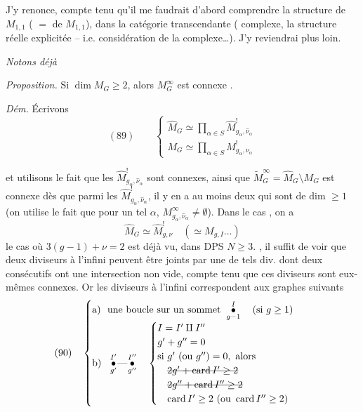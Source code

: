 \documentclass[11pt,a4paper]{article}
\begin{document}
J'y renonce, compte tenu qu'il me faudrait d'abord comprendre la structure de $M_{1,1}$ ( $=$ de $M_{1,1}$),  dans la catégorie transcendante ( complexe,   la structure réelle explicitée -- i.e. considération de la  complexe…). J'y reviendrai plus loin.

\emph{Notons déjà}

\emph{Proposition.} Si $\dim M_G \geq 2$, alors $M^{\infty}_{G}$ est connexe  .

\emph{Dém.} Écrivons
\[
(89)\qquad
\begin{cases}
\widehat{M}_G \simeq \prod\limits_{\alpha \in S} \widehat{M}^{!}_{g_\alpha, \hat{\nu}_\alpha} \\
M_G \simeq \prod\limits_{\alpha \in S} M^{!}_{g_\alpha, \nu_\alpha}
\end{cases}
\]

et utilisons le fait que les $\widehat{M}^{!}_{g_\alpha, \hat{\nu}_\alpha}$ sont connexes, ainsi que $\widetilde{M}^{\infty}_{G} = \widehat{M}_G \setminus M_G$ est connexe dès que  parmi les $\widehat{M}^{!}_{g_\alpha, \hat{\nu}_\alpha}$, il y en a au moins deux qui sont de dim $\geq 1$ (on utilise le fait que pour un tel $\alpha$, \ill{}
$M^{\infty}_{g_\alpha, \hat{\nu}_\alpha} \neq \emptyset$). Dans le cas , on a
\[
\widehat{M}_G \simeq \widehat{M}^{!}_{g,\nu} \quad (\simeq M_{g,I} \ldots)
\]
le cas où $3(g-1) + \nu = 2$ est déjà vu, \struck{\ill{}} dans DPS $N \geq 3$. , il suffit de voir que deux diviseurs à l'infini peuvent être joints par une  de tels div. dont deux consécutifs ont une intersection non vide, compte tenu que ces diviseurs sont eux-mêmes connexes. Or les diviseurs à l'infini correspondent aux  graphes suivants
\[
(90)\quad
\begin{cases}
\text{a)}\ \ \text{une boucle sur un sommet } \overset{I}{\underset{g-1}{\bullet}} \quad (\text{si } g \geq 1) \\
\text{b)}\ \ \overset{I'}{\underset{g'}{\bullet}}\!\text{---}\!\overset{I''}{\underset{g''}{\bullet}} \quad
\begin{cases}
I = I' \amalg I'' \\
g' + g'' = 0 \\
\text{si } g' \text{ (ou } g'') = 0, \text{ alors} \\
\quad \text{\struck{$2g' + \operatorname{card} I' \geq 2$}} \\
\quad \text{\struck{$2g'' + \operatorname{card} I'' \geq 2$}} \\
\quad \operatorname{card} I' \geq 2 \ (\text{ou } \operatorname{card} I'' \geq 2)
\end{cases}
\end{cases}
\]
\end{document}
